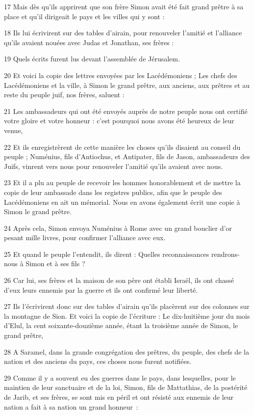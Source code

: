 \par 17 Mais dès qu'ils apprirent que son frère Simon avait été fait grand prêtre à sa place et qu'il dirigeait le pays et les villes qui y sont :
\par 18 Ils lui écrivirent sur des tables d'airain, pour renouveler l'amitié et l'alliance qu'ils avaient nouées avec Judas et Jonathan, ses frères :
\par 19 Quels écrits furent lus devant l'assemblée de Jérusalem.
\par 20 Et voici la copie des lettres envoyées par les Lacédémoniens ; Les chefs des Lacédémoniens et la ville, à Simon le grand prêtre, aux anciens, aux prêtres et au reste du peuple juif, nos frères, saluent :
\par 21 Les ambassadeurs qui ont été envoyés auprès de notre peuple nous ont certifié votre gloire et votre honneur : c'est pourquoi nous avons été heureux de leur venue,
\par 22 Et ils enregistrèrent de cette manière les choses qu'ils disaient au conseil du peuple ; Numénius, fils d'Antiochus, et Antipater, fils de Jason, ambassadeurs des Juifs, vinrent vers nous pour renouveler l'amitié qu'ils avaient avec nous.
\par 23 Et il a plu au peuple de recevoir les hommes honorablement et de mettre la copie de leur ambassade dans les registres publics, afin que le peuple des Lacédémoniens en ait un mémorial. Nous en avons également écrit une copie à Simon le grand prêtre.
\par 24 Après cela, Simon envoya Numénius à Rome avec un grand bouclier d'or pesant mille livres, pour confirmer l'alliance avec eux.
\par 25 Et quand le peuple l'entendit, ils dirent : Quelles reconnaissances rendrons-nous à Simon et à ses fils ?
\par 26 Car lui, ses frères et la maison de son père ont établi Israël, ils ont chassé d'eux leurs ennemis par la guerre et ils ont confirmé leur liberté.
\par 27 Ils l'écrivirent donc sur des tables d'airain qu'ils placèrent sur des colonnes sur la montagne de Sion. Et voici la copie de l'écriture : Le dix-huitième jour du mois d'Elul, la cent soixante-douzième année, étant la troisième année de Simon, le grand prêtre,
\par 28 A Saramel, dans la grande congrégation des prêtres, du peuple, des chefs de la nation et des anciens du pays, ces choses nous furent notifiées.
\par 29 Comme il y a souvent eu des guerres dans le pays, dans lesquelles, pour le maintien de leur sanctuaire et de la loi, Simon, fils de Mattathias, de la postérité de Jarib, et ses frères, se sont mis en péril et ont résisté aux ennemis de leur nation a fait à sa nation un grand honneur :
